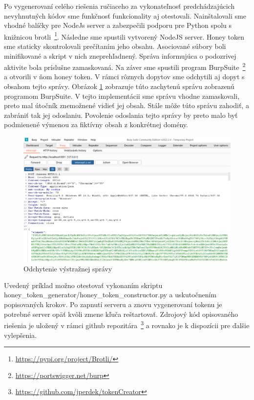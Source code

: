 \documentclass[conference, 11pt,slovak,a4paper,twoside]{IEEEtran}
\begin{document}
Po vygenerovaní celého riešenia ručiaceho za vykonateľnosť predchádzajúcich nevyhnutných kódov sme funkčnosť funkcionality aj otestovali. Nainštalovali sme vhodné balíčky pre NodeJs server a zabezpečili podporu pre Python spolu s knižnicou brotli~\footnote{\url{https://pypi.org/project/Brotli/}}. Následne sme spustili vytvorený NodeJS server. Honey token sme staticky skontrolovali prečítaním jeho obsahu. Asociované súbory boli minifikované a skript v nich zneprehľadnený. Správa informujúca o podozrivej aktivite bola príslušne zamaskovaná. Na záver sme spustili program BurpSuite~\footnote{\url{https://portswigger.net/burp}} a otvorili v ňom honey token. V rámci rôznych dopytov sme odchytili aj dopyt s obsahom tejto správy. Obrázok \ref{burpSuiteCapturing} zobrazuje túto zachytenú správu zobrazenú programom BurpSuite. V tejto implementácii sme správu vhodne zamaskovali, preto mal útočník znemožnené vidieť jej obsah. Stále môže túto správu zahodiť, a zabrániť tak jej odoslaniu. Povolenie odoslania tejto správy by preto malo byť podmienené výmenou za fiktívny obsah z konkrétnej domény. 

\begin{figure}[!t]  %
					\begin{center}
									\includegraphics[width=\linewidth]{fig/burpSuite.png}
									\caption{Odchytenie výstražnej správy}
									\label{burpSuiteCapturing}
					\end{center}
\end{figure}

Uvedený príklad možno otestovať vykonaním skriptu honey\_token\_generator/honey\_token\_constructor.py a uskutočnením popisovaných krokov. Po zapnutí serveru a znovu vygenerovaní tokenu je potrebné server opäť kvôli zmene kľuča reštartovať. Zdrojový kód opisovaného riešenia je uložený v rámci github repozitára~\footnote{\url{https://github.com/jperdek/tokenCreator}} a rovnako je k dispozícii pre ďalšie vylepšenia.
\end{document}
